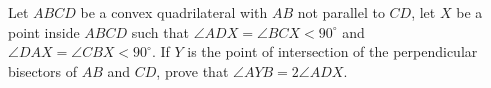 Let $ABCD$ be a convex quadrilateral with $AB$ not parallel to $CD$, let $X$ be a point inside $ABCD$ such that $\angle ADX = \angle BCX < 90^\circ$ and $\angle DAX = \angle CBX < 90^\circ$. If $Y$ is the point of intersection of the perpendicular bisectors of $AB$ and $CD$, prove that $\angle AYB = 2\angle ADX$.
